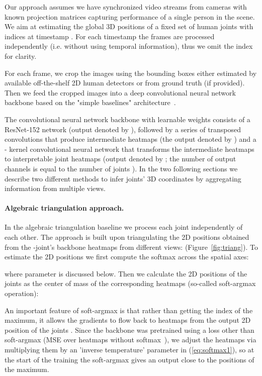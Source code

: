 \documentclass[10pt,twocolumn,letterpaper]{article}
\newcommand{\fig}[1]{Figure~\ref{fig:#1}}
\newcommand{\eq}[1]{(\ref{eq:#1})}
\begin{document}
Our approach assumes we have synchronized video streams from  cameras with known projection matrices  capturing performance of a single person in the scene. We aim at estimating the global 3D positions  of a fixed set of human joints with indices  at timestamp . For each timestamp the frames are processed independently  (i.e. without using temporal information), thus we omit the index  for clarity.

For each frame, we crop the images using the bounding boxes either estimated by available off-the-shelf 2D human detectors or from ground truth (if provided). Then we feed the cropped images  into a deep convolutional neural network backbone based on the "simple baselines" architecture~\cite{xiao2018simple}. 

The convolutional neural network backbone with learnable weights  consists of a ResNet-152 network (output denoted by ), followed by a series of transposed convolutions that produce intermediate heatmaps (the output denoted by ) and a  - kernel convolutional neural network that transforms the intermediate heatmaps to interpretable joint heatmaps (output denoted by ; the number of output channels is equal to the number of joints ).
In the two following sections we describe two different methods to infer joints' 3D coordinates by aggregating information from multiple views.


\paragraph{Algebraic triangulation approach.}
In the algebraic triangulation baseline we process each joint  independently of each other. The approach is built upon triangulating the 2D positions obtained from the -joint's backbone heatmaps from different views:  (\fig{triang}). To estimate the 2D positions we first compute the softmax across the spatial axes: 

where parameter  is discussed below. Then we calculate the 2D positions of the joints as the center of mass of the corresponding heatmaps (so-called soft-argmax operation):


An important feature of soft-argmax is that rather than getting the index of the maximum, it allows the gradients to flow back to heatmaps  from the output 2D position of the joints .  Since the backbone was pretrained using a loss other than soft-argmax (MSE over heatmaps without softmax~\cite{sun2018integral}), we adjust the heatmaps via multiplying them by an 'inverse temperature' parameter  in \eq{softmax1}, so at the start of the training the soft-argmax gives an output close to the positions of the maximum.
\end{document}
